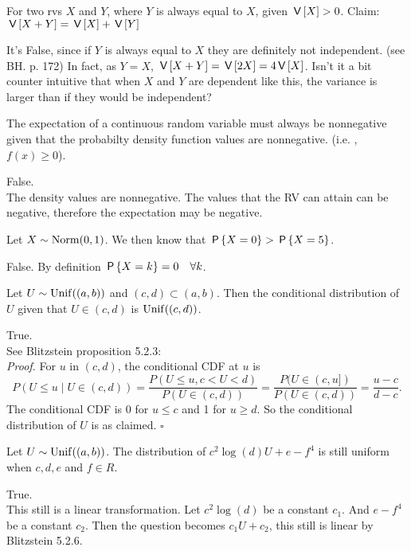\documentclass[tf-tutorial-all.tex]{subfiles}
\begin{document}
\begin{truefalse}
For two rvs $X$ and $Y$, where $Y$ is always equal to $X$, given $\V{X}>0$. Claim: $\V{X+Y} = \V{X} + \V{Y}$
\begin{solution}
It's False, since if $Y$ is always equal to $X$ they are definitely not independent.
(see BH. p. 172) In fact, as $Y=X$, $\V{X+Y} = \V{2X} = 4 \V X$.
Isn't it a bit counter intuitive that when $X$ and $Y$ are dependent like this, the variance is larger than if they would be independent?
\end{solution}
\end{truefalse}

\begin{truefalse}
The expectation of a continuous random variable must always be nonnegative given that the probabilty density function values are nonnegative. (i.e. , $f(x) \geq 0$).
\begin{solution}
False.\\
The density values are nonnegative. The values that the RV can attain can be negative, therefore the expectation may be negative.
\end{solution}
\end{truefalse}

\begin{truefalse}
Let $X \sim \Norm{0, 1}$. We then know that $\P{X = 0} > \P{X = 5}$.
\begin{solution}
False. By definition $\P{X = k} = 0 \quad \forall k $.
\end{solution}
\end{truefalse}

\begin{truefalse}
Let $U \sim \Unif{(a,b)}$ and  $(c,d) \subset (a,b)$. Then the conditional distribution of $U$ given that $U \in (c,d)$ is $\Unif{(c,d)}$.
\begin{solution}
True.
\\See Blitzstein proposition 5.2.3:\\
\textit{Proof.} For $u$ in $(c, d)$, the conditional CDF at $u$ is
$$
P(U \leq u \mid U \in(c, d))=\frac{P(U \leq u, c<U<d)}{P(U \in(c, d))}=\frac{P(U \in(c, u])}{P(U \in(c, d))}=\frac{u-c}{d-c} .
$$
The conditional CDF is 0 for $u \leq c$ and 1 for $u \geq d$. So the conditional distribution of $U$ is as claimed.
$\square$
\end{solution}
\end{truefalse}

\begin{truefalse}
Let $U \sim \Unif{(a,b)}$. The distribution of $c^{2} \log(d) U + e - f^{4}$ is still uniform when $c,d, e $ and $ f \in R$. \\
\begin{solution}
True.\\
This still is a linear transformation. Let $c^{2} \log(d)$ be a constant $c_{1}$. And $e - f^{4}$ be a constant $c_{2}$. Then the question becomes $c_{1} U + c_{2} $, this still is linear by Blitzstein 5.2.6.
\end{solution}
\end{truefalse}
\end{document}
